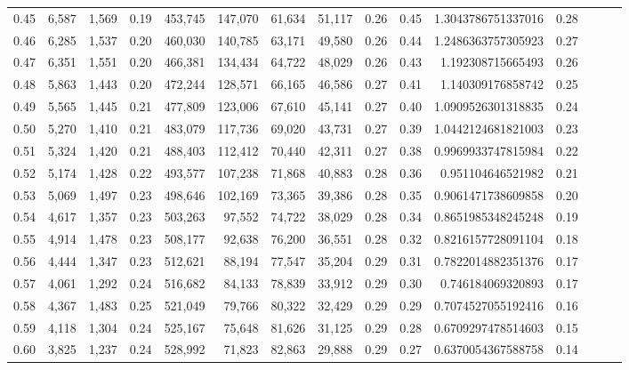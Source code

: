 \begin{tabular}{rrrrrrrrrrrrrrr}
0.45 &   6,587 &  1,569 &  0.19 &  453,745 &  147,070 &   61,634 &   51,117 &  0.26 &  0.45 &    1.3043786751337016 &      0.28 \\
0.46 &   6,285 &  1,537 &  0.20 &  460,030 &  140,785 &   63,171 &   49,580 &  0.26 &  0.44 &    1.2486363757305923 &      0.27 \\
0.47 &   6,351 &  1,551 &  0.20 &  466,381 &  134,434 &   64,722 &   48,029 &  0.26 &  0.43 &     1.192308715665493 &      0.26 \\
0.48 &   5,863 &  1,443 &  0.20 &  472,244 &  128,571 &   66,165 &   46,586 &  0.27 &  0.41 &     1.140309176858742 &      0.25 \\
0.49 &   5,565 &  1,445 &  0.21 &  477,809 &  123,006 &   67,610 &   45,141 &  0.27 &  0.40 &    1.0909526301318835 &      0.24 \\
0.50 &   5,270 &  1,410 &  0.21 &  483,079 &  117,736 &   69,020 &   43,731 &  0.27 &  0.39 &    1.0442124681821003 &      0.23 \\
0.51 &   5,324 &  1,420 &  0.21 &  488,403 &  112,412 &   70,440 &   42,311 &  0.27 &  0.38 &    0.9969933747815984 &      0.22 \\
0.52 &   5,174 &  1,428 &  0.22 &  493,577 &  107,238 &   71,868 &   40,883 &  0.28 &  0.36 &     0.951104646521982 &      0.21 \\
0.53 &   5,069 &  1,497 &  0.23 &  498,646 &  102,169 &   73,365 &   39,386 &  0.28 &  0.35 &    0.9061471738609858 &      0.20 \\
0.54 &   4,617 &  1,357 &  0.23 &  503,263 &   97,552 &   74,722 &   38,029 &  0.28 &  0.34 &    0.8651985348245248 &      0.19 \\
0.55 &   4,914 &  1,478 &  0.23 &  508,177 &   92,638 &   76,200 &   36,551 &  0.28 &  0.32 &    0.8216157728091104 &      0.18 \\
0.56 &   4,444 &  1,347 &  0.23 &  512,621 &   88,194 &   77,547 &   35,204 &  0.29 &  0.31 &    0.7822014882351376 &      0.17 \\
0.57 &   4,061 &  1,292 &  0.24 &  516,682 &   84,133 &   78,839 &   33,912 &  0.29 &  0.30 &     0.746184069320893 &      0.17 \\
0.58 &   4,367 &  1,483 &  0.25 &  521,049 &   79,766 &   80,322 &   32,429 &  0.29 &  0.29 &    0.7074527055192416 &      0.16 \\
0.59 &   4,118 &  1,304 &  0.24 &  525,167 &   75,648 &   81,626 &   31,125 &  0.29 &  0.28 &    0.6709297478514603 &      0.15 \\
0.60 &   3,825 &  1,237 &  0.24 &  528,992 &   71,823 &   82,863 &   29,888 &  0.29 &  0.27 &    0.6370054367588758 &      0.14 \\

\end{tabular}
